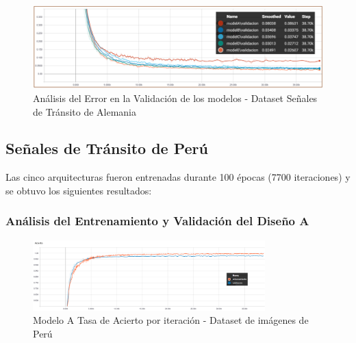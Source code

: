 			\begin{figure}[H]
				\includegraphics[width=1\textwidth, height=\textheight,keepaspectratio]{images/desarrollo/trainResults/germanSummary_validError} 
				\begin{center}
				\caption{\small{Análisis del Error en la Validación de los modelos - Dataset Señales de Tránsito de Alemania}}
				
				{\small{\fontsize{10}{16.8}\selectfont {Fuente: Elaboración propia}}}
				\end{center}
				\vspace{-1.5em}
			\end{figure}
	









	\newpage
	\subsection{Señales de Tránsito de Perú}
		Las cinco arquitecturas fueron entrenadas durante 100 épocas (7700 iteraciones) y se obtuvo los siguientes resultados:

		\subsubsection{Análisis del Entrenamiento y Validación del Diseño A}  
			\begin{figure}[H]
				\begin{center}
				\includegraphics[width=0.8\textwidth]{images/desarrollo/trainResults/peru/model0Acierto} 
				\end{center}
				\begin{center}
				\caption{\small{Modelo A Tasa de Acierto por iteración - Dataset de imágenes de Perú  }}
				
				{\small{\fontsize{10}{16.8}\selectfont {Fuente: Elaboración propia}}}
				\end{center}
				\vspace{-1.5em}
			\end{figure}

